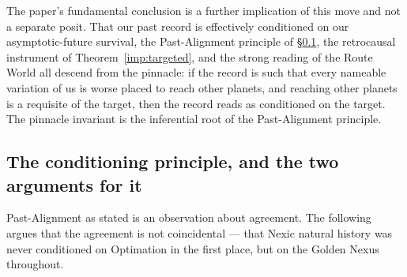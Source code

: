 The paper's fundamental conclusion is a further implication of this
move and not a separate posit. That our past record is effectively
conditioned on our asymptotic-future survival, the Past-Alignment
principle of \S\ref{gc:sub:conditioning}, the retrocausal instrument
of Theorem~\ref{imp:targeted}, and the strong reading of the
Route World all descend from the pinnacle: if the record is such that
every nameable variation of us is worse placed to reach other planets,
and reaching other planets is a requisite of the target, then the
record reads as conditioned on the target. The pinnacle invariant is
the inferential root of the Past-Alignment principle.


\subsection{The conditioning principle, and the two arguments for it}\label{gc:sub:conditioning}

Past-Alignment as stated is an observation about agreement. The
following argues that the agreement is not coincidental --- that
Nexic natural history was never conditioned on Optimation in the first
place, but on the Golden Nexus throughout.

